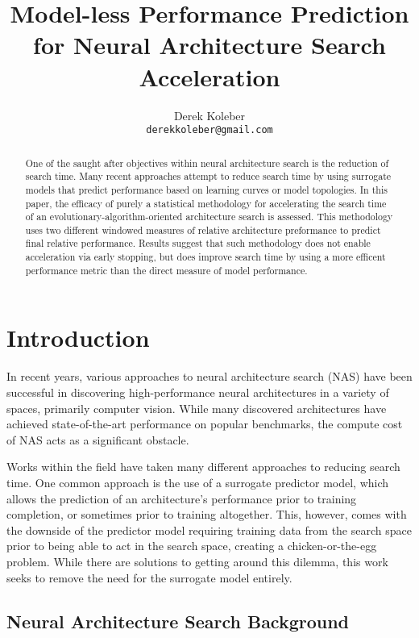 \documentclass[twocolumn]{article}
\title{Model-less Performance Prediction for Neural Architecture Search Acceleration}
\author{%
  Derek Koleber \\
  \texttt{derekkoleber@gmail.com}  
}
\begin{document}
\maketitle

\begin{abstract}
    One of the saught after objectives within neural architecture search
    is the reduction of search time. Many recent approaches attempt to reduce
    search time by using surrogate models that predict performance
    based on learning curves or model topologies. 
    In this paper, the efficacy of purely a statistical methodology for accelerating
    the search time of an evolutionary-algorithm-oriented architecture search is assessed. 
    This methodology uses two different windowed measures of relative architecture preformance
    to predict final relative performance.
    Results suggest that such methodology does not enable acceleration via early stopping, 
    but does improve search time by using a more efficent performance metric than the direct measure of model performance.
\end{abstract}

\section{Introduction}

In recent years, various approaches to neural architecture search (NAS) have been 
successful in discovering high-performance neural architectures in a variety of spaces, primarily computer vision.
While many discovered architectures have achieved state-of-the-art performance on popular benchmarks, the compute cost of NAS acts as a significant obstacle.

Works within the field have taken many different approaches to reducing search time.
One common approach is the use of a surrogate predictor model,
which allows the prediction of an architecture's performance prior to training completion, or sometimes prior to training altogether.
This, however, comes with the downside of the predictor model requiring training data from the search space prior to being able to 
act in the search space, creating a chicken-or-the-egg problem.
While there are solutions to getting around this dilemma, this work seeks to remove the need for the surrogate model entirely.

\subsection {Neural Architecture Search Background}
\end{document}
